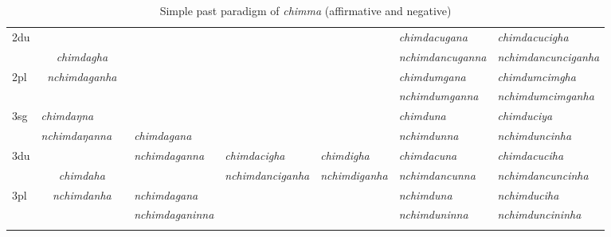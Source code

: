 \begin{landscape}
\begin{table}[p]
{\begin{tabular}{|l||p{2.4cm}|p{2.0cm}|p{2.6cm}|p{2.6cm}|p{2.6cm}|p{3.2cm}|p{3.2cm}|}
 \cline{1-2} \cline{7-8}			
{\sc 2du}		& \multicolumn{2}{c|}{}     &  \multicolumn{3}{c|}{\cellcolor[gray]{.8}} & \it  chimdacugana  & \it   chimdacucigha \\
		&  	\multicolumn{2}{c|}{\it chimdagha} & \multicolumn{3}{c|}{ \cellcolor[gray]{.8}}& \it nchimdancuganna  & \it  nchimdancunciganha \\
 \cline{1-1} \cline{7-8}			
{\sc 2pl}		& 	\multicolumn{2}{c|}{\it nchimdaganha} &  \multicolumn{3}{c|}{ \cellcolor[gray]{.8}}& \it  chimdumgana& \it  chimdumcimgha  \\
		& \multicolumn{2}{c|}{ }&  \multicolumn{3}{c|}{\cellcolor[gray]{.8} }& \it  nchimdumganna & \it  nchimdumcimganha \\
\hline			
{\sc 3sg} 		& \it chimdaŋna	  & \it 	      	& \it   			& \it     & \it     	& \it chimduna& \it chimduciya\\
		& \it  nchimdaŋanna   & \it    	& \it  chimdagana	& \it   & \it    & \it nchimdunna& \it nchimduncinha\\
  \cline{1-2}  \cline{7-8}					
{\sc 3du}&   \multicolumn{2}{c|}{}& \it nchimdaganna& \it  chimdacigha& \it chimdigha& \it   chimdacuna & \it   chimdacuciha\\
	& \multicolumn{2}{c|}{\it chimdaha}& \it  & \it nchimdanciganha& \it  nchimdiganha & \it  nchimdancunna & \it  nchimdancuncinha\\
 \cline{1-1} \cline{4-4} \cline{7-8}	
{\sc 3pl} &  \multicolumn{2}{c|}{\it nchimdanha}	& \it nchimdagana& \it  & \it  & \it nchimduna& \it nchimduciha\\	
	& \multicolumn{2}{c|}{ }& \it nchimdaganinna& \it & \it  & \it nchimduninna& \it nchimduncininha \\
\lspbottomrule
\end{tabular}
}
\caption{Simple past paradigm of \emph{chimma}  (affirmative and negative)}\label{par-chimd-pst}
\end{table}




\end{landscape}
